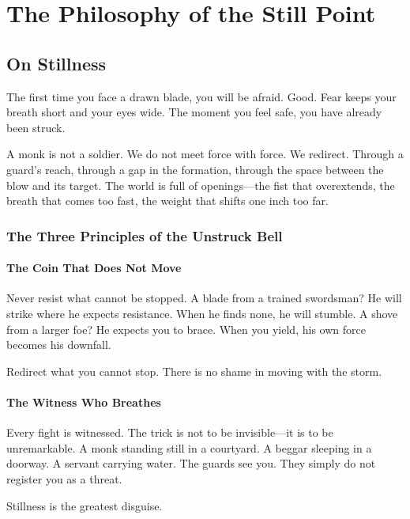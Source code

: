 \documentclass[11pt]{book}
\begin{document}
\tableofcontents

\mainmatter

\part{The Philosophy of the Still Point}


\chapter{On Stillness}

The first time you face a drawn blade, you will be afraid. Good. Fear keeps your breath short and your eyes wide. The moment you feel safe, you have already been struck.

A monk is not a soldier. We do not meet force with force. We redirect. Through a guard's reach, through a gap in the formation, through the space between the blow and its target. The world is full of openings---the fist that overextends, the breath that comes too fast, the weight that shifts one inch too far.

\section{The Three Principles of the Unstruck Bell}

\subsection{The Coin That Does Not Move}

Never resist what cannot be stopped. A blade from a trained swordsman? He will strike where he expects resistance. When he finds none, he will stumble. A shove from a larger foe? He expects you to brace. When you yield, his own force becomes his downfall.

Redirect what you cannot stop. There is no shame in moving with the storm.

\subsection{The Witness Who Breathes}

Every fight is witnessed. The trick is not to be invisible---it is to be unremarkable. A monk standing still in a courtyard. A beggar sleeping in a doorway. A servant carrying water. The guards see you. They simply do not register you as a threat.

Stillness is the greatest disguise.
\end{document}
